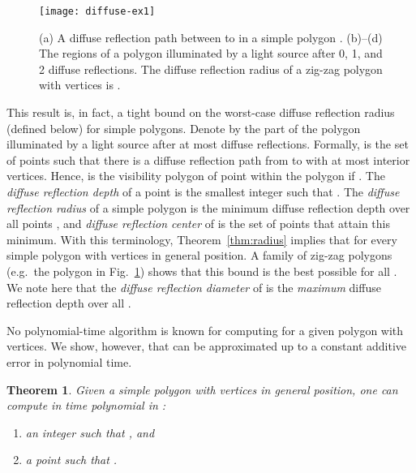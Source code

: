 \documentclass[12pt]{article}
\newtheorem{theorem}{Theorem}
\begin{document}
\begin{figure}[htb]
\centering
\texttt{[image: diffuse-ex1]}
\caption{(a) A diffuse reflection path between  to  in a simple polygon . (b)--(d) The regions of a polygon illuminated by a light source  after 0, 1, and 2 diffuse reflections. The diffuse reflection radius of a zig-zag polygon with  vertices is .}
\label{fig:diffuse-ex1}
\end{figure}

This result is, in fact, a tight bound on the worst-case diffuse reflection radius (defined below) for simple polygons.
Denote by  the part of the polygon illuminated by a light source  after at most  diffuse reflections. Formally,  is the set of points  such that there is a diffuse reflection path from  to  with at most  interior vertices. Hence,  is the visibility polygon of point  within the polygon  if . The \emph{diffuse reflection depth} of a point  is the smallest integer  such that . The \emph{diffuse reflection radius}  of a simple polygon  is the minimum diffuse reflection depth over all points , and \emph{diffuse reflection center} of  is the set of points  that attain this minimum. With this terminology, Theorem~\ref{thm:radius} implies that  for every simple polygon  with  vertices in general position. A family of zig-zag polygons (e.g.\ the polygon in Fig.~\ref{fig:diffuse-ex1}) shows that this bound is the best possible for all . We note here that the \emph{diffuse reflection diameter}  of  is the \emph{maximum} diffuse reflection depth over all .

No polynomial-time algorithm is known for computing  for a given polygon  with  vertices. We show, however, that  can be approximated up to a constant additive error in polynomial time.
\begin{theorem}\label{thm:apx-compute-radius}
 Given a simple polygon  with  vertices in general position,
 one can compute in time polynomial in :
\begin{enumerate}
\item an integer  such that , and
\item a point  such that .
\end{enumerate}
\end{theorem}
\end{document}
